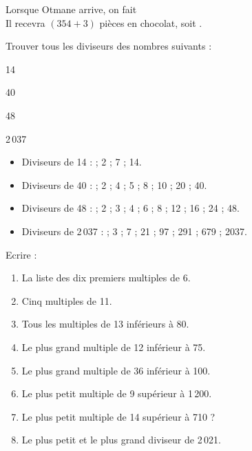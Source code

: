 \begin{colonne*exercice}
\begin{corrige}
   Lorsque Otmane arrive, on fait {\small {}} \\
   Il recevra $(354+3)$ pièces en chocolat, soit {}. \\
\end{corrige}

\bigskip


 \begin{exercice} %
   Trouver tous les diviseurs des nombres suivants :
   \begin{colitemize}{2}
      \item 14
      \item 40
      \item 48
      \item 2\,037
   \end{colitemize}
\end{exercice}

\begin{corrige}
   \begin{itemize}
      \item Diviseurs de 14 : { ; 2 ; 7 ; 14}.
      \item Diviseurs de 40 : { ; 2 ; 4 ; 5 ; 8 ; 10 ; 20 ; 40}.
      \item Diviseurs de 48 : { ; 2 ; 3 ; 4 ; 6 ; 8 ; 12 ; 16 ; 24 ; 48}.
      \item Diviseurs de 2\,037 : { ; 3 ; 7 ; 21 ; 97 ; 291 ; 679 ; 2037}.
   \end{itemize}
\end{corrige}

\bigskip


\begin{exercice} %
   Ecrire :
   \begin{enumerate}
      \item La liste des dix premiers multiples de 6.
      \item Cinq multiples de 11.
      \item Tous les multiples de 13 inférieurs à 80.
      \item Le plus grand multiple de 12 inférieur à 75.
      \item Le plus grand multiple de 36 inférieur à 100.
      \item Le plus petit multiple de 9 supérieur à 1\,200.
      \item Le plus petit multiple de 14 supérieur à 710 ?
      \item Le plus petit et le plus grand diviseur de 2\,021.
   \end{enumerate}
\end{exercice}


\end{colonne*exercice}
